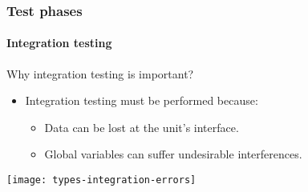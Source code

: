 \begin{frame}
\frametitle{Test phases}
\framesubtitle{Integration testing}

\begin{block:fact}{Why integration testing is important?}
\begin{itemize}
	\item Integration testing must be performed because:
	\begin{itemize}
		\item Data can be lost at the unit's interface.

		\item Global variables can suffer undesirable interferences.
	\end{itemize}
\end{itemize}
\end{block:fact}

\begin{block:fact}{}
    \centering
    \texttt{[image: types-integration-errors]}
\end{block:fact}
\end{frame}


